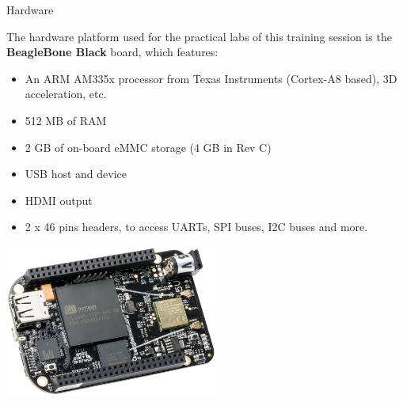 \documentclass[a4paper,12pt,obeyspaces,spaces,hyphens]{article}
\begin{document}
\feshowtitle

\certificate{}
\disabilities{}

\feagendatwocolumn
{Hardware}
{
  The hardware platform used for the practical labs of this training
  session is the {\bf BeagleBone Black} board, which features:

  \begin{itemize}
  \item An ARM AM335x processor from Texas Instruments (Cortex-A8
    based), 3D acceleration, etc.
  \item 512 MB of RAM
  \item 2 GB of on-board eMMC storage
        \newline(4 GB in Rev C)
  \item USB host and device
  \item HDMI output
  \item 2 x 46 pins headers, to access UARTs, SPI buses, I2C buses
    and more.
  \end{itemize}
}
{}
{
  \begin{center}
    \includegraphics[height=5cm]{../slides/beagleboneblack-board/beagleboneblack.png}
  \end{center}
}
\end{document}

